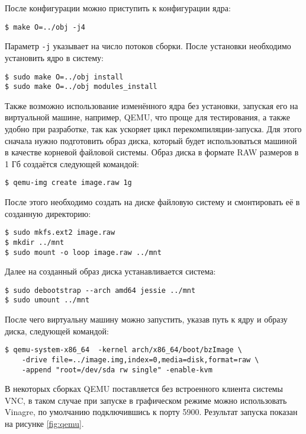 После конфигурации можно приступить к конфигурации ядра:
\medskip
\begin{lstlisting}[style=cstyle]
$ make O=../obj -j4
\end{lstlisting}
\medskip

Параметр \texttt{-j} указывает на число потоков сборки.
После установки необходимо установить ядро в систему:
\medskip
\begin{lstlisting}[style=cstyle]
$ sudo make O=../obj install
$ sudo make O=../obj modules_install
\end{lstlisting}
\medskip

Также возможно использование изменённого ядра без установки, запуская его на
виртуальной машине, например, QEMU, что проще для тестирования, а также удобно
при разработке, так как ускоряет цикл перекомпиляции-запуска. Для этого сначала
нужно подготовить образ диска, который будет использоваться машиной в качестве
корневой файловой системы. Образ диска в формате RAW размеров в 1 Гб создаётся
следующей командой:
\medskip
\begin{lstlisting}[style=cstyle]
$ qemu-img create image.raw 1g
\end{lstlisting}
\medskip

После этого необходимо создать на диске файловую систему и смонтировать её в
созданную директорию:
\medskip
\begin{lstlisting}[style=cstyle]
$ sudo mkfs.ext2 image.raw
$ mkdir ../mnt
$ sudo mount -o loop image.raw ../mnt
\end{lstlisting}
\medskip

Далее на созданный образ диска устанавливается система:
\medskip
\begin{lstlisting}[style=cstyle]
$ sudo debootstrap --arch amd64 jessie ../mnt
$ sudo umount ../mnt
\end{lstlisting}
\medskip

После чего виртуальну машину можно запустить, указав путь к ядру и образу диска,
следующей командой:
\medskip
\begin{lstlisting}[style=cstyle]
$ qemu-system-x86_64  -kernel arch/x86_64/boot/bzImage \
    -drive file=../image.img,index=0,media=disk,format=raw \
    -append "root=/dev/sda rw single" -enable-kvm
\end{lstlisting}
\medskip

В некоторых сборках QEMU поставляется без встроенного клиента системы VNC, в
таком случае при запуске в графическом режиме можно использовать Vinagre, по
умолчанию подключившись к порту 5900. Результат запуска показан на рисунке
\ref{fig:qemu}.


